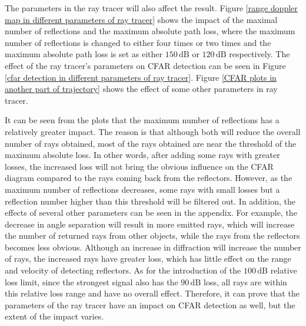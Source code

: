\documentclass[12pt,DIV14,BCOR12mm,a4paper,footinclude=false,headinclude,parskip=half-,twoside,openright,cleardoublepage=empty,toc=index,bibliography=totoc,listof=totoc]{scrreprt}
\numberwithin{equation}{chapter}
\begin{document}
The parameters in the ray tracer will also affect the result. Figure \ref{range doppler map in different parameters of ray tracer} shows the impact of the maximal number of reflections and the maximum absolute path loss, where the maximum number of reflections is changed to either four times or two times and the maximum absolute path loss is set as either $150\,\mathrm{dB}$ or $120\,\mathrm{dB}$ respectively. The effect of the ray tracer's parameters on CFAR detection can be seen in Figure \ref{cfar detection in different parameters of ray tracer}. Figure \ref{CFAR plots in another part of trajectory} shows the effect of some other parameters in ray tracer.

It can be seen from the plots that the maximum number of reflections has a relatively greater impact. The reason is that although both will reduce the overall number of rays obtained, most of the rays obtained are near the threshold of the maximum absolute loss. In other words, after adding some rays with greater losses, the increased loss will not bring the obvious influence on the CFAR diagram compared to the rays coming back from the reflectors. However, as the maximum number of reflections decreases, some rays with small losses but a reflection number higher than this threshold will be filtered out. In addition, the effects of several other parameters can be seen in the appendix. For example, the decrease in angle separation will result in more emitted rays, which will increase the number of returned rays from other objects, while the rays from the reflectors becomes less obvious. Although an increase in diffraction will increase the number of rays, the increased rays have greater loss, which has little effect on the range and velocity of detecting reflectors. As for the introduction of the $100\,\mathrm{dB}$ relative loss limit, since the strongest signal also has the $90\,\mathrm{dB}$ loss, all rays are within this relative loss range and have no overall effect. Therefore, it can prove that the parameters of the ray tracer have an impact on CFAR detection as well, but the extent of the impact varies.
\end{document}
